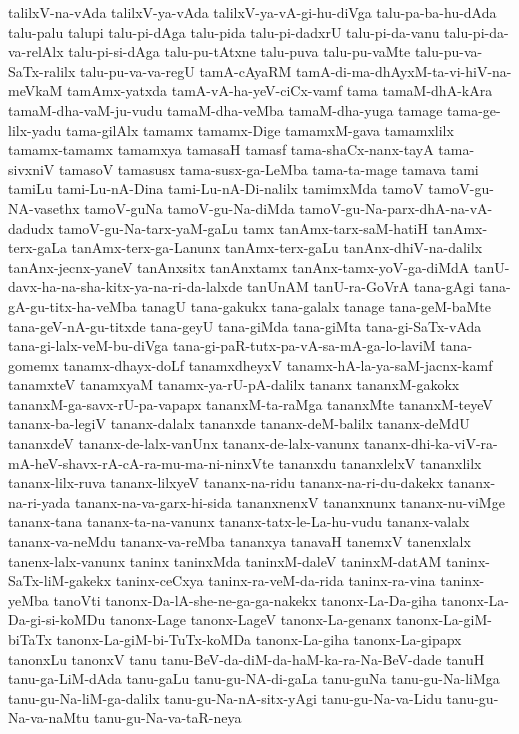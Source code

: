 {talilxV-na-vAda
talilxV-ya-vAda
talilxV-ya-vA-gi-hu-diVga
talu-pa-ba-hu-dAda
talu-palu
talupi
talu-pi-dAga
talu-pida
talu-pi-dadxrU
talu-pi-da-vanu
talu-pi-da-va-relAlx
talu-pi-si-dAga
talu-pu-tAtxne
talu-puva
talu-pu-vaMte
talu-pu-va-SaTx-ralilx
talu-pu-va-va-regU
tamA-cAyaRM
tamA-di-ma-dhAyxM-ta-vi-hiV-na-meVkaM
tamAmx-yatxda
tamA-vA-ha-yeV-ciCx-vamf
tama
tamaM-dhA-kAra
tamaM-dha-vaM-ju-vudu
tamaM-dha-veMba
tamaM-dha-yuga
tamage
tama-ge-lilx-yadu
tama-gilAlx
tamamx
tamamx-Dige
tamamxM-gava
tamamxlilx
tamamx-tamamx
tamamxya
tamasaH
tamasf
tama-shaCx-nanx-tayA
tama-sivxniV
tamasoV
tamasusx
tama-susx-ga-LeMba
tama-ta-mage
tamava
tami
tamiLu
tami-Lu-nA-Dina
tami-Lu-nA-Di-nalilx
tamimxMda
tamoV
tamoV-gu-NA-vasethx
tamoV-guNa
tamoV-gu-Na-diMda
tamoV-gu-Na-parx-dhA-na-vA-dadudx
tamoV-gu-Na-tarx-yaM-gaLu
tamx
tanAmx-tarx-saM-hatiH
tanAmx-terx-gaLa
tanAmx-terx-ga-Lanunx
tanAmx-terx-gaLu
tanAnx-dhiV-na-dalilx
tanAnx-jecnx-yaneV
tanAnxsitx
tanAnxtamx
tanAnx-tamx-yoV-ga-diMdA
tanU-davx-ha-na-sha-kitx-ya-na-ri-da-lalxde
tanUnAM
tanU-ra-GoVrA
tana-gAgi
tana-gA-gu-titx-ha-veMba
tanagU
tana-gakukx
tana-galalx
tanage
tana-geM-baMte
tana-geV-nA-gu-titxde
tana-geyU
tana-giMda
tana-giMta
tana-gi-SaTx-vAda
tana-gi-lalx-veM-bu-diVga
tana-gi-paR-tutx-pa-vA-sa-mA-ga-lo-laviM
tana-gomemx
tanamx-dhayx-doLf
tanamxdheyxV
tanamx-hA-la-ya-saM-jacnx-kamf
tanamxteV
tanamxyaM
tanamx-ya-rU-pA-dalilx
tananx
tananxM-gakokx
tananxM-ga-savx-rU-pa-vapapx
tananxM-ta-raMga
tananxMte
tananxM-teyeV
tananx-ba-legiV
tananx-dalalx
tananxde
tananx-deM-balilx
tananx-deMdU
tananxdeV
tananx-de-lalx-vanUnx
tananx-de-lalx-vanunx
tananx-dhi-ka-viV-ra-mA-heV-shavx-rA-cA-ra-mu-ma-ni-ninxVte
tananxdu
tananxlelxV
tananxlilx
tananx-lilx-ruva
tananx-lilxyeV
tananx-na-ridu
tananx-na-ri-du-dakekx
tananx-na-ri-yada
tananx-na-va-garx-hi-sida
tananxnenxV
tananxnunx
tananx-nu-viMge
tananx-tana
tananx-ta-na-vanunx
tananx-tatx-le-La-hu-vudu
tananx-valalx
tananx-va-neMdu
tananx-va-reMba
tananxya
tanavaH
tanemxV
tanenxlalx
tanenx-lalx-vanunx
taninx
taninxMda
taninxM-daleV
taninxM-datAM
taninx-SaTx-liM-gakekx
taninx-ceCxya
taninx-ra-veM-da-rida
taninx-ra-vina
taninx-yeMba
tanoVti
tanonx-Da-lA-she-ne-ga-ga-nakekx
tanonx-La-Da-giha
tanonx-La-Da-gi-si-koMDu
tanonx-Lage
tanonx-LageV
tanonx-La-genanx
tanonx-La-giM-biTaTx
tanonx-La-giM-bi-TuTx-koMDa
tanonx-La-giha
tanonx-La-gipapx
tanonxLu
tanonxV
tanu
tanu-BeV-da-diM-da-haM-ka-ra-Na-BeV-dade
tanuH
tanu-ga-LiM-dAda
tanu-gaLu
tanu-gu-NA-di-gaLa
tanu-guNa
tanu-gu-Na-liMga
tanu-gu-Na-liM-ga-dalilx
tanu-gu-Na-nA-sitx-yAgi
tanu-gu-Na-va-Lidu
tanu-gu-Na-va-naMtu
tanu-gu-Na-va-taR-neya
}
